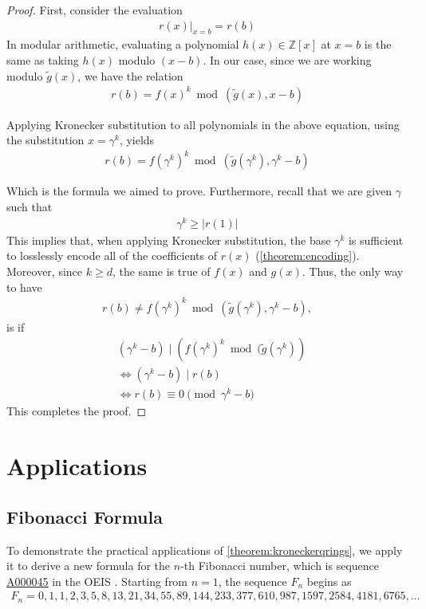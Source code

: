 \documentclass[12pt,reqno]{article}
\theoremstyle{plain}
\theoremstyle{definition}
\newcommand{\eval}[2]{\left . #1 \right|_{#2}}
\newcommand{\seqnum}[1]{\href{https://oeis.org/#1}{\rm \underline{#1}}}
\begin{document}
\begin{proof}
First, consider the evaluation 
\begin{align*}
    \eval{r(x)}{x=b} = r(b)
\end{align*}
In modular arithmetic, evaluating a polynomial $h(x) \in \mathbb{Z}[x]$ at $x=b$ is the same as taking $h(x)$ modulo $(x - b)$. In our case, since we are working modulo $\tilde{g}(x)$, we have the relation
\begin{align*}
    r(b) = f(x)^k \bmod{(\tilde{g}(x), x - b)}
\end{align*}

Applying Kronecker substitution to all polynomials in the above equation, using the substitution $x = \gamma^k$, yields
\begin{align*}
    r(b) = f(\gamma^k)^k \bmod{(\tilde{g}(\gamma^k), \gamma^k - b)}
\end{align*}

Which is the formula we aimed to prove. Furthermore, recall that we are given $\gamma$ such that
\begin{align*}
    \gamma^k \geq |r(1)|
\end{align*}
This implies that, when applying Kronecker substitution, the base $\gamma^k$ is sufficient to losslessly encode all of the coefficients of $r(x)$ (\cref{theorem:encoding}). Moreover, since $k \geq d$, the same is true of $f(x)$ and $g(x)$. Thus, the only way to have
\begin{align}
    r(b) \not= f(\gamma^k)^k \bmod{(\tilde{g}(\gamma^k), \gamma^k - b)} ,
\end{align}
is if
\begin{align*}
    & (\gamma^k - b) \mid (f(\gamma^k)^k \bmod{(\tilde{g}(\gamma^k)}) \\
    & \Longleftrightarrow (\gamma^k - b) \mid r(b) \\
    & \Longleftrightarrow r(b) \equiv 0 \pmod{\gamma^k - b}
\end{align*}
This completes the proof.
\end{proof}

\section{Applications} \label{section:applications}

\subsection{Fibonacci Formula}
To demonstrate the practical applications of \cref{theorem:kroneckerqrings}, we apply it to derive a new formula for the $n$-th Fibonacci number, which is sequence \seqnum{A000045} in the OEIS \cite{A000045}.  Starting from $n=1$, the sequence $F_n$ begins as
\begin{align*}
    F_n = 0, 1, 1, 2, 3, 5, 8, 13, 21, 34, 55, 89, 144, 233, 377, 610, 987, 1597, 2584, 4181, 6765, \ldots
\end{align*}
\end{document}
